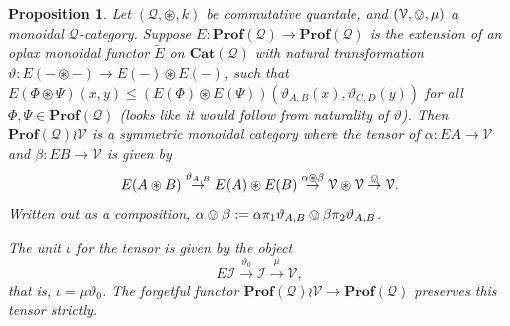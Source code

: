 \documentclass[12pt]{article}
\theoremstyle{definition}
\theoremstyle{plain}
\theoremstyle{plain}
\newtheorem{proposition}{Proposition}[section]
\theoremstyle{plain}
\theoremstyle{plain}
\theoremstyle{remark}
\theoremstyle{remark}
\newcommand{\mc}[1]{\mathcal{#1}}
\begin{document}
\begin{proposition}
	Let $(\mc{Q}, \circledast, k)$ be commutative quantale, and $(\mc{V}, \ovee, \mu)$ a monoidal $\mc{Q}$-category. Suppose $E: \mathbf{Prof}(\mc{Q}) \rightarrow \mathbf{Prof}(\mc{Q})$ is the extension of an oplax monoidal functor $\tilde E$ on $\mathbf{Cat}(\mc{Q})$ with natural transformation $\vartheta: E(-\circledast -) \rightarrow E(-) \circledast E(-)$, such that \textcolor{BrickRed} {$E(\Phi \circledast \Psi)(x,y) \leq (E(\Phi) \circledast E(\Psi))(\vartheta_{A,B}(x), \vartheta_{C,D}(y))$ for all $\Phi, \Psi \in \mathbf{Prof}(\mc{Q})$} (looks like it would follow from naturality of $\vartheta$). Then $\mathbf{Prof}(\mc{Q}) \wr \mc{V}$ is a symmetric monoidal category where the tensor of $\alpha: EA \rightarrow \mc{V}$ and $\beta: EB \rightarrow \mc{V}$ is given by
	$$
	E(A \circledast B) \overset{\vartheta_{A,B}}{\rightarrow} E(A) \circledast E(B) \overset{\alpha \circledast \beta}{\rightarrow} \mc{V} \circledast \mc{V} \overset{\ovee}{\rightarrow} \mc{V}.
	$$
	Written out as a composition, $\alpha \ovee \beta := \alpha\pi_1\vartheta_{A,B} \ovee \beta\pi_2\vartheta_{A,B}$.
	
	The unit $\iota$ for the tensor is given by the object
	$$
	E\mc{I} \overset{\vartheta_0}{\rightarrow} \mc{I} \overset{\mu}{\rightarrow} \mc{V},
	$$
	that is, $\iota = \mu\vartheta_0$.
	The forgetful functor $\mathbf{Prof}(\mc{Q}) \wr \mc{V} \rightarrow \mathbf{Prof}(\mc{Q})$ preserves this tensor strictly.
\end{proposition}
\end{document}
